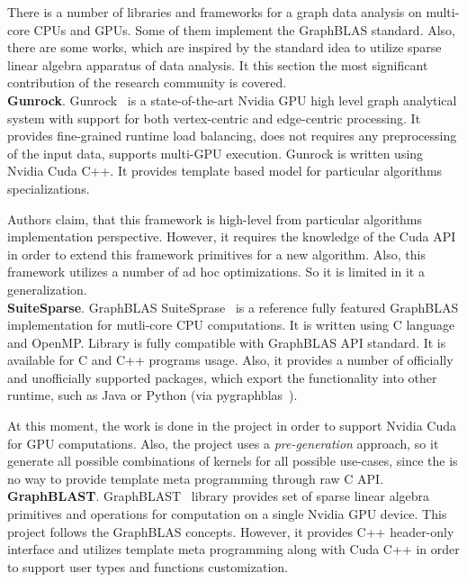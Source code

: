 There is a number of libraries and frameworks for a graph data analysis on multi-core CPUs and GPUs. Some of them implement the GraphBLAS standard. Also, there are some works, which are inspired by the standard idea to utilize sparse linear algebra apparatus of data analysis. It this section the most significant contribution of the research community is covered.\\

\textbf{Gunrock}. Gunrock~\cite{article:gunrock} is a state-of-the-art Nvidia GPU high level graph analytical system with support for both vertex-centric and edge-centric processing. It provides fine-grained runtime load balancing, does not requires any preprocessing of the input data, supports multi-GPU execution. Gunrock is written using Nvidia Cuda C++. It provides template based model for particular algorithms specializations. 

Authors claim, that this framework is high-level from particular algorithms implementation perspective. However, it requires the knowledge of the Cuda API in order to extend this framework primitives for a new algorithm. Also, this framework utilizes a number of ad hoc optimizations. So it is limited in it a generalization.\\

\textbf{SuiteSparse}. GraphBLAS SuiteSprase~\cite{article:suite_sparse_for_graph_problems} is a reference fully featured GraphBLAS implementation for mutli-core CPU computations. It is written using C language and OpenMP. Library is fully compatible with GraphBLAS API standard. It is available for C and C++ programs usage. Also, it provides a number of officially and unofficially supported packages, which export the functionality into other runtime, such as Java or Python (via pygraphblas~\cite{net:pygraphblas}).

At this moment, the work is done in the project in order to support Nvidia Cuda for GPU computations. Also, the project uses a \textit{pre-generation} approach, so it generate all possible combinations of kernels for all possible use-cases, since the is no way to provide template meta programming through raw C API.\\

\textbf{GraphBLAST}. GraphBLAST~\cite{yang2019graphblast} library provides set of sparse linear algebra primitives and operations for computation on a single Nvidia GPU device. This project follows the GraphBLAS concepts. However, it provides C++ header-only interface and utilizes template meta programming along with Cuda C++ in order to support user types and functions customization. 

